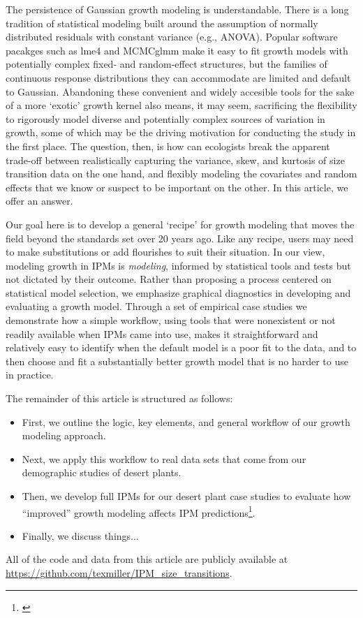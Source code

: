 \documentclass[11pt]{article}
\newcommand{\tom}[2]{{\color{red}{#1}}\footnote{\textit{\color{red}{#2}}}}
\begin{document}
{The persistence of Gaussian growth modeling is understandable. 
There is a long tradition of statistical modeling built around the assumption of normally distributed residuals with constant variance (e.g., ANOVA).
Popular software pacakges such as lme4 \citep{bates2007lme4} and MCMCglmm \citep{hadfield2010mcmc} make it easy to fit growth models with potentially complex fixed- and random-effect structures, but the families of continuous response distributions they can accommodate are limited and default to Gaussian.
Abandoning these convenient and widely accesible tools for the sake of a more `exotic' growth kernel also means, it may seem, sacrificing the flexibility to rigorously model diverse and potentially complex sources of variation in growth, some of which may be the driving motivation for conducting the study in the first place.
The question, then, is how can ecologists break the apparent trade-off between realistically capturing the variance, skew, and kurtosis of size transition data on the one hand, and flexibly modeling the covariates and random effects that we know or suspect to be important on the other. 
In this article, we offer an answer. 

Our goal here is to develop a general `recipe' for growth modeling that moves the field beyond the standards set over 20 years ago.
Like any recipe, users may need to make substitutions or add flourishes to suit their situation. 
In our view, modeling growth in IPMs is \emph{modeling}, informed by statistical tools and tests but not dictated by their outcome. 
Rather than proposing a process centered on statistical model selection, we emphasize graphical diagnostics in developing and 
evaluating a growth model. Through a set of empirical case studies we demonstrate how a simple workflow, using tools 
that were nonexistent or not readily available when IPMs came into use, makes it straightforward and relatively 
easy to identify when the default model is a poor fit to the data, and to then choose and fit a substantially 
better growth model that is no harder to use in practice. 

The remainder of this article is structured as follows:
\begin{itemize}
\item First, we outline the logic, key elements, and general workflow of our growth modeling approach.
\item Next, we apply this workflow to real data sets that come from our demographic studies of desert plants.
\item Then, we develop full IPMs for our desert plant case studies to evaluate how ``improved'' growth modeling affects IPM predictions\tom{}{I am still interested in possibly doing a simulation study to ask if there are particular types of life histories where getting the tails of size transitions right matters more or less. But punting that for now.}. 
\item Finally, we discuss things...
\end{itemize}
All of the code and data from this article are publicly available at \url{https://github.com/texmiller/IPM_size_transitions}.

}
\end{document}
